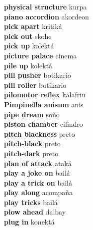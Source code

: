 \textbf{ physical structure  } kurpa \\
\textbf{ piano accordion  } akordeon \\
\textbf{ pick apart  } kritiká \\
\textbf{ pick out  } skohe \\
\textbf{ pick up  } kolektá \\
\textbf{ picture palace  } cinema \\
\textbf{ pile up  } kolektá \\
\textbf{ pill pusher  } botikario \\
\textbf{ pill roller  } botikario \\
\textbf{ pilomotor reflex  } kalafriu \\
\textbf{ Pimpinella anisum  } anis \\
\textbf{ pipe dream  } soño \\
\textbf{ piston chamber  } cilindro \\
\textbf{ pitch blackness  } preto \\
\textbf{ pitch-black  } preto \\
\textbf{ pitch-dark  } preto \\
\textbf{ plan of attack  } ataká \\
\textbf{ play a joke on  } bailá \\
\textbf{ play a trick on  } bailá \\
\textbf{ play along  } acompaña \\
\textbf{ play tricks  } bailá \\
\textbf{ plow ahead  } dalbay \\
\textbf{ plug in  } konektá \\
